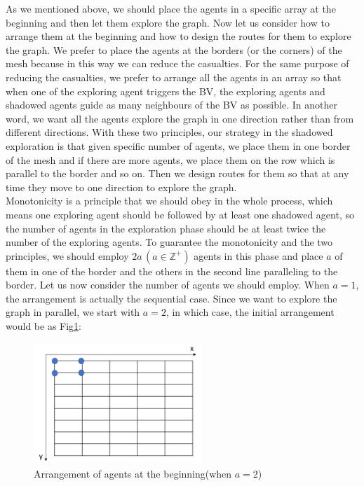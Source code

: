 As we mentioned above, we should place the agents in a specific array at the beginning and then let them explore the graph. Now let us consider how to arrange them at the beginning and how to design the routes for them to explore the graph. We prefer to place the agents at the borders (or the corners) of the mesh because in this way we can reduce the casualties. For the same purpose of reducing the casualties, we prefer to arrange all the agents in an array so that when one of the exploring agent triggers the BV, the exploring agents and shadowed agents guide as many neighbours of the BV as possible. In another word, we want all the agents explore the graph in one direction rather than   from different directions. With these two principles, our strategy in the shadowed exploration is that given specific number of agents, we place them in one border of the mesh and if there are more agents, we place them on the row which is parallel to the border and so on. Then we design routes for them so that at any time they move to one direction to explore the graph. \\
Monotonicity is a principle that we should obey in the whole process, which means one exploring agent should be followed by at least one shadowed agent, so the number of agents in the exploration phase should be at least twice the number of the exploring agents. To guarantee the monotonicity and the two principles, we should employ $2a\,(a\in\mathbb{Z}^+)$ agents in this phase and place $a$ of them in one of the border and the others in the second line paralleling to the border.
Let us now consider the number of agents we should employ.
When $a=1$, the arrangement is actually the sequential case. Since we want to explore the graph in parallel,  we start with  $a=2$, in which case, the initial arrangement would be as Fig\ref{fig:twoagent1}:
\begin{figure}[H]
  \centering  
  \includegraphics[width=2.5in]{figures/twoagent1.png}
  \caption{Arrangement of agents at the beginning(when $a=2$)}\label{fig:twoagent1}
\end{figure}

